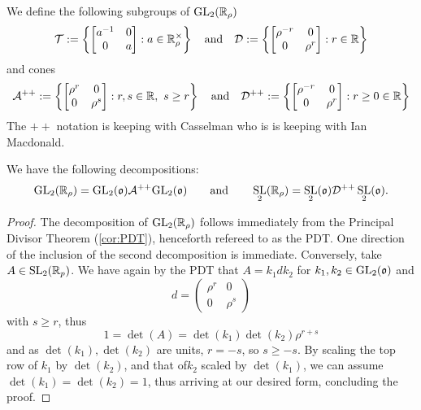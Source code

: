 \documentclass[draft]{amsart}
\DeclareMathOperator{\SL}{SL}
\begin{document}
    
    \begin{defn} \label{def:subGrpOfSL}
        We define the following subgroups of \(\mathrm{GL}_2(\mathbb{R}_\rho)\)
        \[\mathcal T := \left\{ \begin{bmatrix}
            a^{-1} & 0 \\ 0 & a
        \end{bmatrix}  : a\in \mathbb{R}_\rho^\times \right\} \quad \text{and} \quad \mathcal D:= \left\{ \begin{bmatrix}
            \rho^{-r} & 0 \\ 0 & \rho^r
        \end{bmatrix} : r\in \mathbb{R} \right\}\]
        and cones
        \[\mathcal A^{++} := \left\{ \begin{bmatrix}
            \rho^r & 0 \\ 0 & \rho^s
        \end{bmatrix}  : r,s\in \mathbb{R},\ s\ge r \right\} \quad \text{and} \quad \mathcal D^{++}:= \left\{ \begin{bmatrix}
            \rho^{-r} & 0 \\ 0 & \rho^{r}
        \end{bmatrix} : r\ge 0 \in \mathbb{R} \right\}\]
        The \(++\) notation is keeping with Casselman \cite{Casselman2014TheBT} who is is keeping with Ian Macdonald.
    \end{defn}
    \begin{prop}
        We have the following decompositions:
        \[\GL_2(\R_\rho)=\GL_2(\mathfrak o)\mathcal A^{++} \GL_2(\mathfrak o)
        \qquad \text{and} \qquad \SL_2(\R_\rho)=\SL_2(\mathfrak o)\mathcal D^{++} \SL_2(\mathfrak o).\]
    \end{prop}
    \begin{proof}
        The decomposition of \(\mathrm{GL}_2(\mathbb{R}_\rho)\) follows immediately from the Principal Divisor Theorem (\ref{cor:PDT}), henceforth refereed to as the PDT. One direction of the inclusion of the second decomposition is immediate. Conversely, take \(A\in \SL_2(\R_p)\). We have again by the PDT that \(A=k_1dk_2\) for \(k_1,k_2\in \mathrm{GL}_2(\mathfrak o)\) and
        \[d=\begin{pmatrix}
            \rho^r &0\\ 0& \rho^s
        \end{pmatrix}\] with \(s\ge r\), thus
        \[1=\det(A)=\det(k_1)\det(k_2)\rho^{r+s}\]
        and as \(\det(k_1),\det(k_2)\) are units, \(r=-s\), so \(s\ge -s\). By scaling the top row of \(k_1\) by \(\det(k_2)\), and that of\(k_2\) scaled by \(\det(k_1)\), we can assume \(\det(k_1)=\det(k_2)=1\), thus arriving at our desired form, concluding the proof.
    \end{proof}
\end{document}

